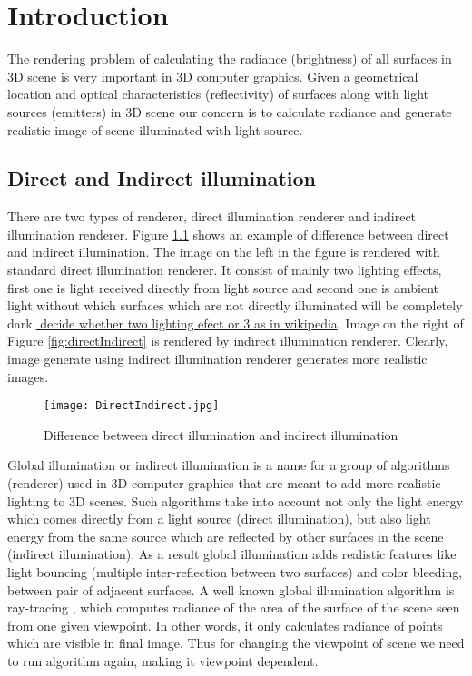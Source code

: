\chapter{\label{Intro}Introduction}

The rendering problem of calculating the radiance  (brightness) of all surfaces in 3D scene is very important in 3D computer graphics. Given a geometrical location and optical characteristics  (reflectivity) of surfaces along with light sources (emitters) in 3D scene our concern is to calculate radiance and generate realistic image of scene illuminated with light source.

\section{Direct and Indirect illumination}
There are two types of renderer, direct illumination renderer and indirect illumination renderer. 
Figure \ref{fig:directindirect} shows an example of difference between direct and indirect illumination. The image on the left in the figure is rendered with standard direct illumination renderer. It consist of mainly two lighting effects, first one is light received directly from light source and second one is ambient light without which surfaces which are not directly illuminated will be completely dark.\underline{ decide whether two lighting efect or 3 as in wikipedia}. Image on the right of Figure \ref{fig:directIndirect} is rendered by indirect illumination renderer. Clearly, image generate using indirect illumination renderer generates more realistic images.
\begin{figure}[tbh]
\centering{}
\captionsetup{justification=centering}
\texttt{[image: DirectIndirect.jpg]}
\caption{\label{fig:directindirect}Difference between direct illumination and indirect illumination \cite{wikiradiosity}}
\end{figure}

Global illumination or indirect illumination is a name for a group of algorithms  (renderer) used in 3D computer graphics that are meant to add more realistic lighting to 3D scenes. Such algorithms take into account not only the light energy which comes directly from a light source  (direct illumination), but also light energy from the same source which are reflected by other surfaces in the scene  (indirect illumination). As a result global illumination adds realistic features like light bouncing  (multiple inter-reflection between two surfaces) and color bleeding, between pair of adjacent surfaces. A well known global illumination algorithm is ray-tracing \cite{Whitted}, which computes  radiance of the area of the surface of the scene seen from one given viewpoint. In other words, it only calculates radiance of points which are visible in final image. Thus for changing the viewpoint of scene we need to run algorithm again, making it viewpoint dependent.

